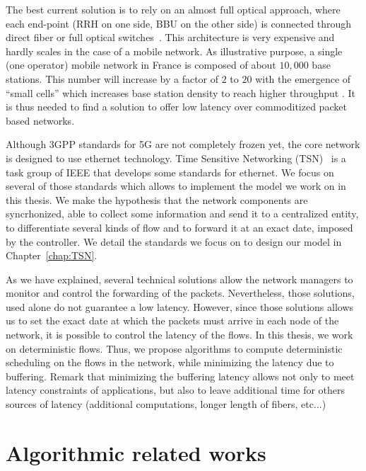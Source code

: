 The best current solution is to rely on an almost full optical approach, where each end-point (RRH on one side, BBU on the other side) is connected through direct fiber or full optical switches~\cite{pizzinat2015things,tayq2017real}. This architecture is very expensive and hardly scales in the case of a mobile network. As illustrative purpose, a single (one operator) mobile network in France is composed of about $10,000$ base stations. This number will increase by a factor of $2$ to $20$ with the emergence of “small cells” which increases base station density to reach higher throughput \cite{leclerc2016transmission,leclerc2016signaling}. It is thus needed to find a solution to offer low latency over commoditized packet based networks. 

Although 3GPP standards for 5G are not completely frozen yet, the core network is designed to use ethernet technology. Time Sensitive Networking (TSN)~\cite{ieee802,ieeep802} is a task group of IEEE that develops some standards for ethernet. We focus on several of those standards which allows to implement the model we work on in this thesis. We make the hypothesis that the network components are syncrhonized, able to collect some information and send it to a centralized entity, to differentiate several kinds of flow and to forward it at an exact date, imposed by the controller. We detail the standards we focus on to design our model in Chapter~\ref{chap:TSN}.

As we have explained, several technical solutions allow the network managers to monitor and control the forwarding of the packets. Nevertheless, those solutions, used alone do not guarantee a low latency. However, since those solutions allows us to set the exact date at which the packets must arrive in each node of the network, it is possible to control the latency of the flows. In this thesis, we work on deterministic flows. Thus, we propose algorithms to compute deterministic scheduling on the flows in the network, while minimizing the latency due to buffering. Remark that minimizing the buffering latency allows not only to meet latency constraints of applications, but also to leave additional time for others sources of latency (additional computations, longer length of fibers, etc...)



\section{Algorithmic related works}
 
